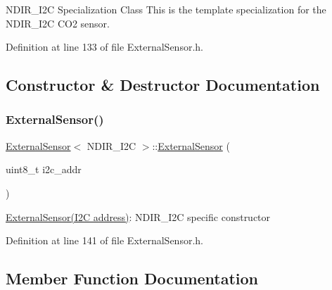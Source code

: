 N\+D\+I\+R\+\_\+\+I2C Specialization Class This is the template specialization for the N\+D\+I\+R\+\_\+\+I2C C\+O2 sensor. 

Definition at line 133 of file External\+Sensor.\+h.



\subsection{Constructor \& Destructor Documentation}
\mbox{\label{class_external_sensor_3_01_n_d_i_r___i2_c_01_4_aa06970ea689679c0e1deb5360e05a0a4}} 
\subsubsection{\texorpdfstring{External\+Sensor()}{ExternalSensor()}}
{\footnotesize\ttfamily \hyperlink{class_external_sensor}{External\+Sensor}$<$ N\+D\+I\+R\+\_\+\+I2C $>$\+::\hyperlink{class_external_sensor}{External\+Sensor} (\begin{DoxyParamCaption}\item[{uint8\+\_\+t}]{i2c\+\_\+addr }\end{DoxyParamCaption})\hspace{0.3cm}{\ttfamily [inline]}}

\hyperlink{class_external_sensor}{External\+Sensor(\+I2\+C address)}\+: N\+D\+I\+R\+\_\+\+I2C specific constructor 

Definition at line 141 of file External\+Sensor.\+h.



\subsection{Member Function Documentation}
\mbox{\label{class_external_sensor_3_01_n_d_i_r___i2_c_01_4_ac6f3614d94968ef0cc11b2b4d69cef03}} 
